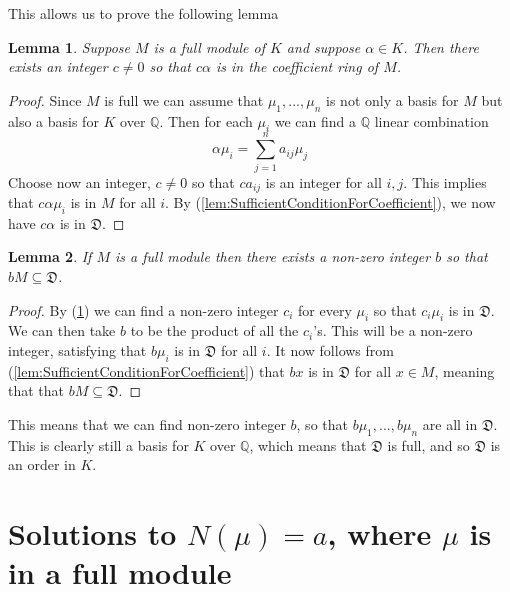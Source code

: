 \documentclass{article}
\newtheorem{lemma}{Lemma}[section]
\newcommand{\mfrak}[1]{\mathfrak{#1}}
\newcommand{\mbb}[1]{\mathbb{#1}}
\begin{document}
This allows us to prove the following lemma 

\begin{lemma} \label{lem:ElementsCanBeScaledToBeInCoefficientRing}
    Suppose $M$ is a full module of $K$ and suppose $\alpha \in K$. Then there exists an integer $c \neq 0$ so that $c \alpha$ is in the coefficient ring of $M$.
\end{lemma}

\begin{proof}
    
Since $M$ is full we can assume that $\mu_1, ..., \mu_n$ is not only a basis for $M$ but also a basis for $K$ over $\mbb Q$. Then for each $\mu_i$ we can find a $\mbb Q$ linear combination
$$\alpha \mu_i = \sum_{j=1}^n a_{ij} \mu_j$$
Choose now an integer, $c \neq 0$ so that $c a_{ij}$ is an integer for all $i,j$. This implies that $c \alpha \mu_i$ is in $M$ for all $i$. By (\ref{lem:SufficientConditionForCoefficient}), we now have $c \alpha$ is in $\mfrak D$. 
\end{proof}

\begin{lemma}\label{lem:ModuleCanBeScaledToFitInsideCoefficientRing}
    If $M$ is a full module then there exists a non-zero integer $b$ so that $bM \subseteq \mfrak D$.
    \end{lemma}
    \begin{proof}
    By (\ref{lem:ElementsCanBeScaledToBeInCoefficientRing}) we can find a non-zero integer $c_i$ for every $\mu_i$ so that $c_i \mu_i$ is in $\mfrak D$. We can then take $b$ to be the product of all the $c_i$'s. This will be a non-zero integer, satisfying that $b \mu_i$ is in $\mfrak D$ for all $i$. It now follows from (\ref{lem:SufficientConditionForCoefficient}) that $bx$ is in $\mfrak D$ for all $x \in M$, meaning that 
    that $b M \subseteq \mfrak D$.
\end{proof}


This means that we can find non-zero integer $b$, so that $b \mu_1, ..., b \mu_n$ are all in $\mfrak D$. This is clearly still a basis for $K$ over $\mbb Q$, which means that $\mfrak D$ is full, and so $\mfrak D$ is an order in $K$.



\section*{Solutions to $N(\mu) = a$, where $\mu$ is in a full module}
\end{document}
